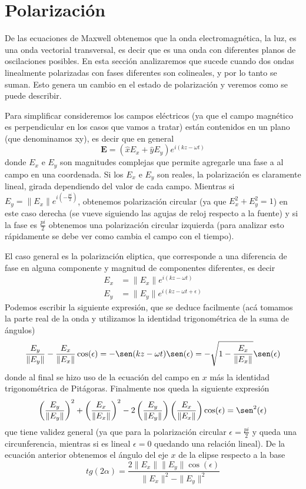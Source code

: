 \documentclass[a4paper,spanish]{article}
\numberwithin{equation}{section}
\begin{document}
\part{Polarizaci\'on}
	De las ecuaciones de Maxwell obtenemos que la onda electromagn\'etica, la luz, es una onda vectorial transversal, es decir que es una onda con diferentes planos de oscilaciones posibles. En esta secci\'on analizaremos que sucede cuando dos ondas linealmente polarizadas con fases diferentes son colineales, y por lo tanto se suman. Esto genera un cambio en el estado de polarizaci\'on y veremos como se puede describir. 

	Para simplificar consideremos los campos el\'ectricos (ya que el campo magn\'etico es perpendicular en los casos que vamos a tratar) est\'an contenidos en un plano (que denominamos xy), es decir que en general \[ \textbf{E} = (\hat{x} E_x + \hat{y} E_y) e^{i(k z - \omega t)}\] donde $E_x$ e $E_y$ son magnitudes complejas que permite agregarle una fase a al campo en una coordenada. Si los $E_x$ e $E_y$ son reales, la polarizaci\'on es claramente lineal, girada dependiendo del valor de cada campo. Mientras si $\displaystyle E_y = \|E_x\| e^{i \left(-\frac{pi}{2}\right)}$, obtenemos polarizaci\'on circular (ya que $E_x^2 + E_y^2 = 1$) en este caso derecha (se vueve siguiendo las agujas de reloj respecto a la fuente) y si la fase es $\frac{pi}{2}$ obtenemos una polarizaci\'on circular izquierda (para analizar esto r\'apidamente se debe ver como cambia el campo con el tiempo).
	
	El caso general es la polarizaci\'on eliptica, que corresponde a una diferencia de fase en alguna componente y magnitud de componentes diferentes, es decir 
	\begin{align*}
		E_x &= \|E_x\| e^{i(k z - \omega t)}\\
		E_y &= \|E_y\| e^{i (k z - \omega t + \epsilon)}
	\end{align*}
	Podemos escribir la siguiente expresi\'on, que se deduce facilmente (ac\'a tomamos la parte real de la onda y utilizamos la identidad trigonom\'etrica de la suma de \'angulos) \[\frac{E_y}{\|E_y\|} - \frac{E_x}{\|E_x\|} \cos(\epsilon) = - \sen(k z - \omega t) \sen(\epsilon) = - \sqrt{1 - \frac{E_x}{\|E_x\|}} \sen(\epsilon)\]
	donde al final se hizo uso de la ecuaci\'on del campo en $x$ m\'as la identidad trigonom\'etrica de Pit\'agoras. Finalmente nos queda la siguiente expresi\'on
	\begin{equation}
		\left(\frac{E_y}{\|E_y\|}\right)^2 + \left(\frac{E_x}{\|E_x\|}\right)^2 - 2 \left(\frac{E_y}{\|E_y\|}\right) \left(\frac{E_x}{\|E_x\|}\right) \cos(\epsilon) = \sen^2(\epsilon)
		\label{eq:polarizacion_elipitica}
	\end{equation}
	que tiene validez general (ya que para la polarizaci\'on circular $\epsilon = \frac{pi}{2}$ y queda una circunferencia, mientras si es lineal $\epsilon = 0$ quedando una relaci\'on lineal). De la ecuaci\'on anterior obtenemos el \'angulo del eje $x$ de la elipse respecto a la base 
	\begin{equation}
		tg(2\alpha) = \frac{2 \|E_x\| \|E_y\| \cos(\epsilon)}{\|E_x\|^2 - \|E_y\|^2}
		\label{eq:polarizacion_eliptica_angulo}
	\end{equation}
	
\end{document}
